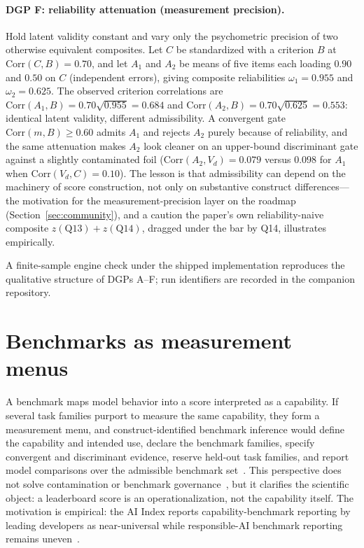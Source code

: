 \documentclass[10pt,letterpaper]{article}
\begin{document}
\paragraph{DGP F: reliability attenuation (measurement precision).}
Hold latent validity constant and vary only the psychometric precision of two otherwise equivalent composites.
Let $C$ be standardized with a criterion $B$ at $\mathrm{Corr}(C,B)=0.70$, and let $A_1$ and $A_2$ be means of five items each loading $0.90$ and $0.50$ on $C$ (independent errors), giving composite reliabilities $\omega_1=0.955$ and $\omega_2=0.625$.
The observed criterion correlations are $\mathrm{Corr}(A_1,B)=0.70\sqrt{0.955}=0.684$ and $\mathrm{Corr}(A_2,B)=0.70\sqrt{0.625}=0.553$: identical latent validity, different admissibility.
A convergent gate $\mathrm{Corr}(m,B)\ge 0.60$ admits $A_1$ and rejects $A_2$ purely because of reliability, and the same attenuation makes $A_2$ look cleaner on an upper-bound discriminant gate against a slightly contaminated foil ($\mathrm{Corr}(A_2,V_d)=0.079$ versus $0.098$ for $A_1$ when $\mathrm{Corr}(V_d,C)=0.10$).
The lesson is that admissibility can depend on the machinery of score construction, not only on substantive construct differences---the motivation for the measurement-precision layer on the roadmap (Section~\ref{sec:community}), and a caution the paper's own reliability-naive composite $z(\mathrm{Q13})+z(\mathrm{Q14})$, dragged under the bar by Q14, illustrates empirically.

A finite-sample engine check under the shipped implementation reproduces the qualitative structure of DGPs A--F; run identifiers are recorded in the companion repository.

\section{Benchmarks as measurement menus}
\label{app:bench}

A benchmark maps model behavior into a score interpreted as a capability.
If several task families purport to measure the same capability, they form a measurement menu, and construct-identified benchmark inference would define the capability and intended use, declare the benchmark families, specify convergent and discriminant evidence, reserve held-out task families, and report model comparisons over the admissible benchmark set~\cite{wallach2025,bean2025}.
This perspective does not solve contamination or benchmark governance~\cite{truong2026}, but it clarifies the scientific object: a leaderboard score is an operationalization, not the capability itself.
The motivation is empirical: the AI Index reports capability-benchmark reporting by leading developers as near-universal while responsible-AI benchmark reporting remains uneven~\cite{hai2026}.
\end{document}
